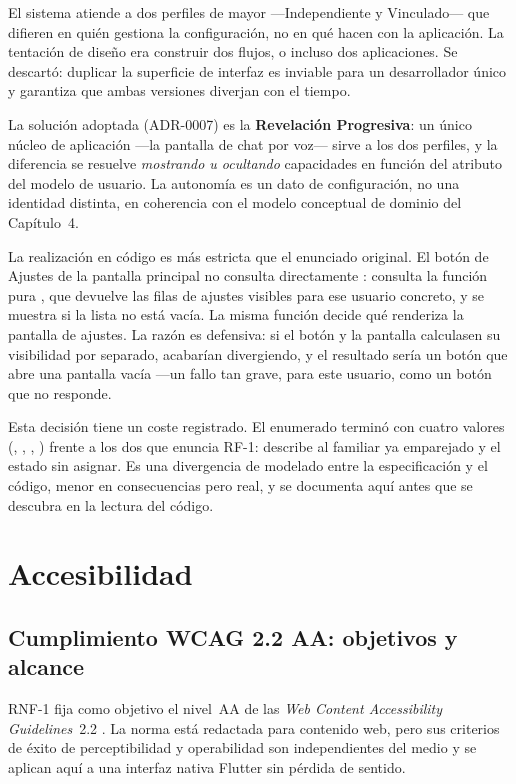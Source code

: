 El sistema atiende a dos perfiles de mayor ---Independiente y Vinculado--- que difieren en quién gestiona
la configuración, no en qué hacen con la aplicación. La tentación de diseño era construir dos flujos, o
incluso dos aplicaciones. Se descartó: duplicar la superficie de interfaz es inviable para un desarrollador
único y garantiza que ambas versiones diverjan con el tiempo.

La solución adoptada (ADR-0007) es la \textbf{Revelación Progresiva}: un único núcleo de aplicación ---la
pantalla de chat por voz--- sirve a los dos perfiles, y la diferencia se resuelve \emph{mostrando u
ocultando} capacidades en función del atributo  del modelo de usuario. La autonomía es un
dato de configuración, no una identidad distinta, en coherencia con el modelo conceptual de dominio del
Capítulo~4.

La realización en código es más estricta que el enunciado original. El botón de Ajustes de la pantalla
principal no consulta directamente : consulta la función pura
, que devuelve las filas de ajustes visibles para ese usuario concreto, y
se muestra si la lista no está vacía. La misma función decide qué renderiza la pantalla de ajustes. La
razón es defensiva: si el botón y la pantalla calculasen su visibilidad por separado, acabarían
divergiendo, y el resultado sería un botón que abre una pantalla vacía ---un fallo tan grave, para este
usuario, como un botón que no responde.

Esta decisión tiene un coste registrado. El enumerado  terminó con cuatro valores
(, , , ) frente a los dos que enuncia RF-1:
 describe al familiar ya emparejado y  el estado sin asignar. Es una divergencia
de modelado entre la especificación y el código, menor en consecuencias pero real, y se documenta aquí
antes que se descubra en la lectura del código.

\section{Accesibilidad}
\label{sec:accesibilidad}

\subsection{Cumplimiento WCAG 2.2 AA: objetivos y alcance}

RNF-1 fija como objetivo el nivel~AA de las \emph{Web Content Accessibility Guidelines}~2.2
\autocite{wcag}. La norma está redactada para contenido web, pero sus criterios de éxito de
perceptibilidad y operabilidad son independientes del medio y se aplican aquí a una interfaz nativa
Flutter sin pérdida de sentido.

